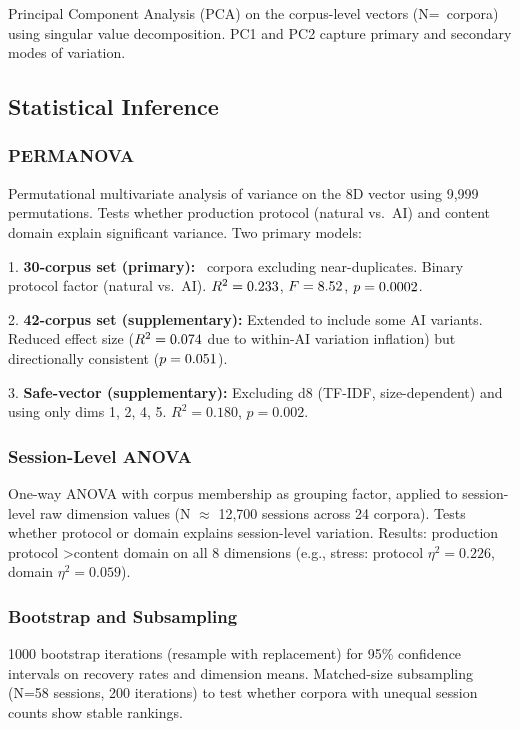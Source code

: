 \documentclass[final]{clv2025}
\begin{document}
Principal Component Analysis (PCA) on the corpus-level vectors (N=\nCorpora\ corpora) using singular value decomposition. PC1 and PC2 capture primary and secondary modes of variation.

\subsection{Statistical Inference}

\subsubsection{PERMANOVA}

Permutational multivariate analysis of variance \citep{anderson2001permanova} on the 8D vector using 9,999 permutations. Tests whether production protocol (natural vs.\ AI) and content domain explain significant variance. Two primary models:

1. \textbf{30-corpus set (primary):} \nCorporaPrimary\ corpora excluding near-duplicates. Binary protocol factor (natural vs.\ AI). $R^2 = 0.233$, $F = 8.52$, $p = 0.0002$.

2. \textbf{42-corpus set (supplementary):} Extended to include some AI variants. Reduced effect size ($R^2 = 0.074$ due to within-AI variation inflation) but directionally consistent ($p = 0.051$).

3. \textbf{Safe-vector (supplementary):} Excluding d8 (TF-IDF, size-dependent) and using only dims 1, 2, 4, 5. $R^2 = 0.180$, $p = 0.002$.

\subsubsection{Session-Level ANOVA}

One-way ANOVA with corpus membership as grouping factor, applied to session-level raw dimension values (N $\approx$ 12,700 sessions across 24 corpora). Tests whether protocol or domain explains session-level variation. Results: production protocol \textgreater content domain on all 8 dimensions (e.g., stress: protocol $\eta^2 = 0.226$, domain $\eta^2 = 0.059$).

\subsubsection{Bootstrap and Subsampling}

1000 bootstrap iterations (resample with replacement) for 95\% confidence intervals on recovery rates and dimension means. Matched-size subsampling (N=58 sessions, 200 iterations) to test whether corpora with unequal session counts show stable rankings.
\end{document}
